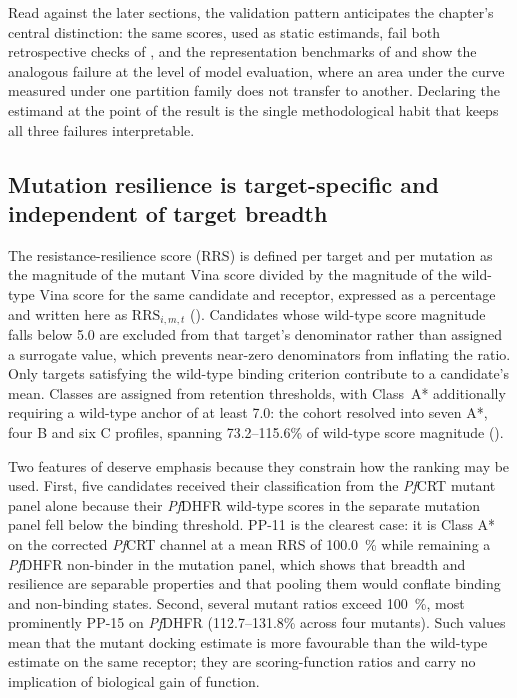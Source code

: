 Read against the later sections, the validation pattern anticipates the chapter's central distinction: the same scores, used as static estimands, fail both retrospective checks of , and the representation benchmarks of  and  show the analogous failure at the level of model evaluation, where an area under the curve measured under one partition family does not transfer to another. Declaring the estimand at the point of the result is the single methodological habit that keeps all three failures interpretable.

\subsection{Mutation resilience is target-specific and independent of target breadth}

The resistance-resilience score (RRS) is defined per target and per mutation as the magnitude of the mutant Vina score divided by the magnitude of the wild-type Vina score for the same candidate and receptor, expressed as a percentage and written here as $\mathrm{RRS}_{i,m,t}$ (). Candidates whose wild-type score magnitude falls below \qty{5.0}{\kcalmol} are excluded from that target's denominator rather than assigned a surrogate value, which prevents near-zero denominators from inflating the ratio. Only targets satisfying the wild-type binding criterion contribute to a candidate's mean. Classes are assigned from retention thresholds, with Class~A* additionally requiring a wild-type anchor of at least \qty{7.0}{\kcalmol}: the cohort resolved into seven A*, four B and six C profiles, spanning \numrange{73.2}{115.6}\% of wild-type score magnitude ().

Two features of  deserve emphasis because they constrain how the ranking may be used. First, five candidates received their classification from the \emph{Pf}CRT mutant panel alone because their \emph{Pf}DHFR wild-type scores in the separate mutation panel fell below the binding threshold. PP-11 is the clearest case: it is Class A* on the corrected \emph{Pf}CRT channel at a mean RRS of \qty{100.0}{\percent} while remaining a \emph{Pf}DHFR non-binder in the mutation panel, which shows that breadth and resilience are separable properties and that pooling them would conflate binding and non-binding states. Second, several mutant ratios exceed \qty{100}{\percent}, most prominently PP-15 on \emph{Pf}DHFR (\numrange{112.7}{131.8}\% across four mutants). Such values mean that the mutant docking estimate is more favourable than the wild-type estimate on the same receptor; they are scoring-function ratios and carry no implication of biological gain of function.

